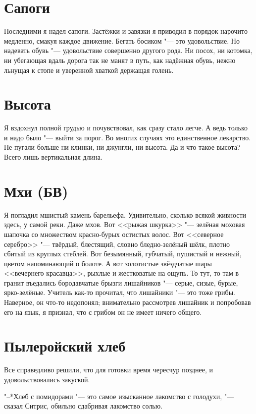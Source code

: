 \documentclass[a4paper,10pt]{book}
\begin{document}
 \section{Сапоги}

 Последними я надел сапоги. Застёжки и завязки я приводил в порядок нарочито 
медленно, смакуя каждое движение. Бегать босиком "--- это удовольствие. Но 
надевать обувь "--- удовольствие совершенно другого рода. Ни посох, ни котомка, 
ни убегающая вдаль дорога так не манят в путь, как надёжная обувь, нежно 
льнущая к стопе и уверенной хваткой держащая голень.
 
 \section{Высота}

 Я вздохнул полной грудью и почувствовал, как сразу стало легче. А ведь только 
и 
надо было "--- выйти за порог. Во многих случаях это единственное лекарство. Не 
пугали больше ни клинки, ни джунгли, ни 
высота. Да и что такое высота? Всего лишь вертикальная длина.
 
 \section{Мхи (БВ)}

 Я погладил мшистый камень барельефа. Удивительно, сколько всякой живности 
здесь, у самой реки. Даже мхов. Вот <<рыжая шкурка>> "--- зелёная моховая 
шапочка со множеством красно-бурых остистых волос. Вот <<северное серебро>> 
"--- 
твёрдый, блестящий, словно бледно-зелёный шёлк, плотно сбитый из 
круглых стеблей. Вот безымянный, губчатый, пушистый и нежный, цветом 
напоминающий о болоте. А вот золотистые звёздчатые шары <<вечернего красавца>>, 
рыхлые и жестковатые на ощупь. То тут, то там в гранит въедались бородавчатые 
брызги лишайников "--- серые, сизые, бурые, ярко-зелёные. Учитель как-то 
прочитал, что лишайники "--- это тоже грибы. Наверное, он что-то недопонял; 
внимательно рассмотрев лишайник и попробовав его на язык, я признал, что с 
грибом он не имеет ничего общего.
 
\section{Пылеройский хлеб}
 
Все справедливо решили, что для готовки время чересчур позднее, и 
удовольствовались закуской.

"--*Хлеб с помидорами "--- это самое изысканное лакомство с голодухи, "--- 
сказал Ситрис, обильно сдабривая лакомство солью.
\end{document}
